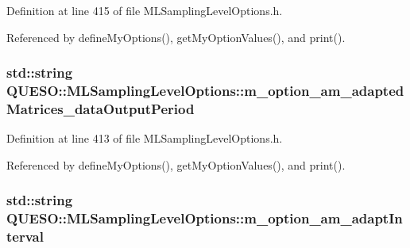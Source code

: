 Definition at line 415 of file M\-L\-Sampling\-Level\-Options.\-h.



Referenced by define\-My\-Options(), get\-My\-Option\-Values(), and print().

\hypertarget{class_q_u_e_s_o_1_1_m_l_sampling_level_options_ac8ab2064bc916c10fa3c7bf1793869e8}{
\subsubsection[{m\-\_\-option\-\_\-am\-\_\-adapted\-Matrices\-\_\-data\-Output\-Period}]{\setlength{\rightskip}{0pt plus 5cm}std\-::string Q\-U\-E\-S\-O\-::\-M\-L\-Sampling\-Level\-Options\-::m\-\_\-option\-\_\-am\-\_\-adapted\-Matrices\-\_\-data\-Output\-Period\hspace{0.3cm}{\ttfamily [private]}}}\label{class_q_u_e_s_o_1_1_m_l_sampling_level_options_ac8ab2064bc916c10fa3c7bf1793869e8}


Definition at line 413 of file M\-L\-Sampling\-Level\-Options.\-h.



Referenced by define\-My\-Options(), get\-My\-Option\-Values(), and print().

\hypertarget{class_q_u_e_s_o_1_1_m_l_sampling_level_options_aaa6a4e45bd064d7b4656e71cfd71d58b}{
\subsubsection[{m\-\_\-option\-\_\-am\-\_\-adapt\-Interval}]{\setlength{\rightskip}{0pt plus 5cm}std\-::string Q\-U\-E\-S\-O\-::\-M\-L\-Sampling\-Level\-Options\-::m\-\_\-option\-\_\-am\-\_\-adapt\-Interval\hspace{0.3cm}{\ttfamily [private]}}}\label{class_q_u_e_s_o_1_1_m_l_sampling_level_options_aaa6a4e45bd064d7b4656e71cfd71d58b}


